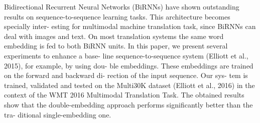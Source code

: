 Bidirectional Recurrent Neural Networks (BiRNNs) have shown outstanding results on sequence-to-sequence learning tasks. This architecture becomes specially inter- esting for multimodal machine translation task, since BiRNNs can deal with images and text. On most translation systems the same word embedding is fed to both BiRNN units. In this paper, we present several experiments to enhance a base- line sequence-to-sequence system (Elliott et al., 2015), for example, by using dou- ble embeddings. These embeddings are trained on the forward and backward di- rection of the input sequence. Our sys- tem is trained, validated and tested on the Multi30K dataset (Elliott et al., 2016) in the context of the WMT 2016 Multimodal Translation Task. The obtained results show that the double-embedding approach performs significantly better than the tra- ditional single-embedding one.
